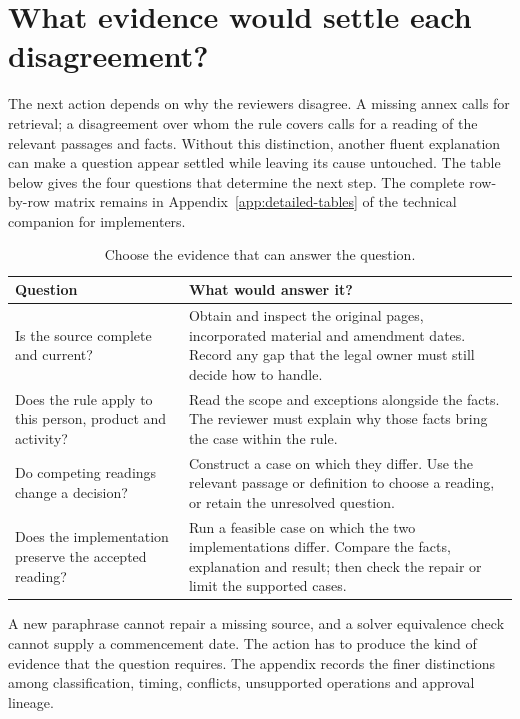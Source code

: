 \section{What evidence would settle each disagreement?}
\label{merge:M06:09}


The next action depends on why the reviewers disagree. A missing annex calls for
retrieval; a disagreement over whom the rule covers calls for a reading of the
relevant passages and facts. Without this distinction, another fluent
explanation can make a question appear settled while leaving its cause untouched.
The table below gives the four
questions that determine the next step. The complete row-by-row matrix remains
in Appendix~\ref{app:detailed-tables} of the technical companion for implementers.

\begin{table}[H]
\centering
\caption{Choose the evidence that can answer the question.}
\label{tab:resolution-matrix}
\begin{tabularx}{\textwidth}{P{54mm}Y}
\toprule
Question & What would answer it?\\
\midrule
Is the source complete and current? & Obtain and inspect the original pages, incorporated material and amendment dates. Record any gap that the legal owner must still decide how to handle.\\
\addlinespace[0.5em]
Does the rule apply to this person, product and activity? & Read the scope and exceptions alongside the facts. The reviewer must explain why those facts bring the case within the rule.\\
\addlinespace[0.5em]
Do competing readings change a decision? & Construct a case on which they differ. Use the relevant passage or definition to choose a reading, or retain the unresolved question.\\
\addlinespace[0.5em]
Does the implementation preserve the accepted reading? & Run a feasible case on which the two implementations differ. Compare the facts, explanation and result; then check the repair or limit the supported cases.\\
\bottomrule
\end{tabularx}
\end{table}

A new paraphrase cannot repair a missing source, and a solver equivalence check
cannot supply a commencement date. The action has to produce the kind of evidence
that the question requires. The appendix records the finer distinctions among
classification, timing, conflicts, unsupported operations and approval lineage.

